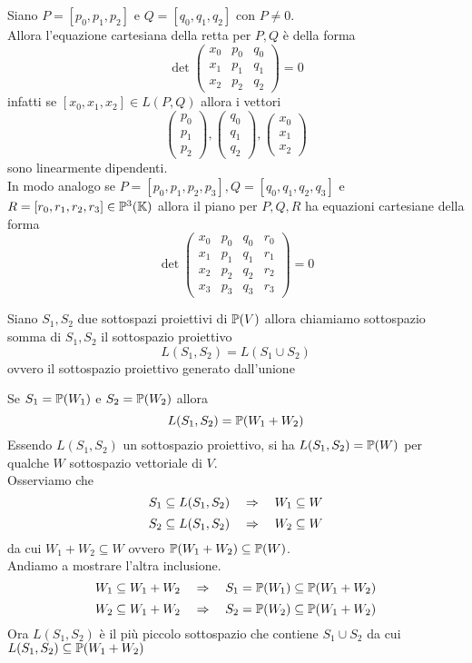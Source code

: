 Siano $P=[p_0,p_1,p_2]$ e $Q=[q_0, q_1,q_2]$ con $P\neq 0$.\\
Allora l'equazione cartesiana della retta per $P,Q$ \`e della forma 
$$\det \begin{pmatrix}
x_0 & p_0& q_0 \\
x_1 & p_1& q_1 \\
x_2 & p_2& q_2 
\end{pmatrix}=0$$
infatti se $[x_0,x_1,x_2]\in L(P,Q)$ allora  i vettori $$\begin{pmatrix} p_0 \\ p_1\\ p_2  
\end{pmatrix}, \begin{pmatrix}
q_0 \\ q_1 \\ q_2
\end{pmatrix} , \begin{pmatrix}
 x_0\\x_1 \\x_2
\end{pmatrix}$$
sono linearmente dipendenti.\\
In modo analogo se   $ P=[p_0, p_1,p_2,p_3],Q=[q_0, q_1,q_2,q_3]$ e $ R=[r_0, r_1,r_2,r_3] \in \mathbb{P}^3(\mathbb{K})$ allora il piano per $P,Q,R$ ha equazioni cartesiane della forma 
$$\det \begin{pmatrix}
x_0 & p_0& q_0 & r_0 \\
x_1 & p_1& q_1 & r_1\\
x_2 & p_2& q_2  & r_2 \\
x_3 & p_3& q_3  & r_3
\end{pmatrix}=0$$

\newpage
\begin{defn}Siano $S_1,S_2$ due sottospazi proiettivi di $\mathbb{P}(V)$ allora chiamiamo sottospazio somma di $S_1,S_2$ il sottospazio proiettivo
$$ L(S_1,S_2) = L(S_1\cup S_2)$$
ovvero il sottospazio proiettivo generato dall'unione
\end{defn}
\begin{lem}Se $S_1=\mathbb{P}(W_1)$ e $S_2 = \mathbb{P}(W_2)$ allora 
$$ L(S_1,S_2) = \mathbb{P}(W_1+W_2)$$
\proof Essendo $L(S_1, S_2)$ un sottospazio proiettivo, si ha $L(S_1, S_2) = \mathbb{P}(W)$ per qualche $W$ sottospazio vettoriale di $V$.\\
Osserviamo che 
$$S_1\subseteq L(S_1,S_2) \quad \Rightarrow \quad W_1 \subseteq W $$
$$S_2\subseteq L(S_1,S_2) \quad \Rightarrow \quad W_2 \subseteq W $$
da cui $W_1+W_2 \subseteq W$ ovvero $\mathbb{P}(W_1+W_2) \subseteq \mathbb{P}(W)$.\\
Andiamo a mostrare l'altra inclusione.\\
$$W_1 \subseteq W_1 + W_2  \quad\Rightarrow\quad S_1 =\mathbb{P}(W_1)\subseteq \mathbb{P}(W_1+W_2)$$
$$W_2 \subseteq W_1 + W_2  \quad\Rightarrow\quad S_2 =\mathbb{P}(W_2)\subseteq \mathbb{P}(W_1+W_2)$$
Ora $L(S_1, S_2)$ \`e il pi\`u piccolo sottospazio che contiene $S_1\cup S_2$ da cui $L(S_1, S_2) \subseteq \mathbb{P}(W_1+W_2)$

\end{lem}

